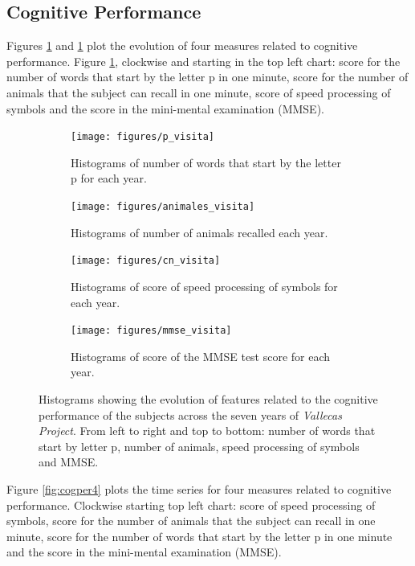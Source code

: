 \documentclass[11pt]{article}
\theoremstyle{definition}
\theoremstyle{remark}
\begin{document}
\subsection{Cognitive Performance}
\label{sse:cogper}
Figures \ref{fig:cogperyears} and \ref{fig:cogperyears} plot the evolution of four measures related to cognitive performance. Figure \ref{fig:cogperyears}, clockwise and starting in the top left chart: score for the number of words that start by the letter p in one minute, score for the number of animals that the subject can recall in one minute, score of speed processing of symbols and the score in the mini-mental examination (MMSE). 

\begin{figure}[H]
    \centering
    \begin{subfigure}[t]{0.4\textwidth}
        \centering
        \texttt{[image: figures/p\_visita]}
        \caption{Histograms of number of words that start by the letter p for each year.}
    \end{subfigure}
    \hfill
    \begin{subfigure}[t]{0.4\textwidth}
        \centering
        \texttt{[image: figures/animales\_visita]}
        \caption{Histograms of number of animals recalled each year.}
    \end{subfigure}%
    
     \begin{subfigure}[t]{0.4\textwidth}
        \centering
        \texttt{[image: figures/cn\_visita]}
        \caption{Histograms of score of speed processing of symbols for each year.}
    \end{subfigure}
    \hfill
    \begin{subfigure}[t]{0.4\textwidth}
        \centering
        \texttt{[image: figures/mmse\_visita]}
        \caption{Histograms of score of the MMSE test score for each year.}
    \end{subfigure}%
   
    \caption{Histograms showing the evolution of features related to the cognitive performance of the subjects across the seven years of \emph{Vallecas Project}. From left to right and top to bottom: number of words that start by letter p, number of animals, speed processing of symbols and MMSE.}
    \label{fig:cogperyears}
\end{figure}

Figure \ref{fig:cogper4} plots the time series for four measures related to cognitive performance. Clockwise starting top left chart: score of speed processing of symbols, score for the number of animals that the subject can recall in one minute, score for the number of words that start by the letter p in one minute and the score in the mini-mental examination (MMSE).
\end{document}
